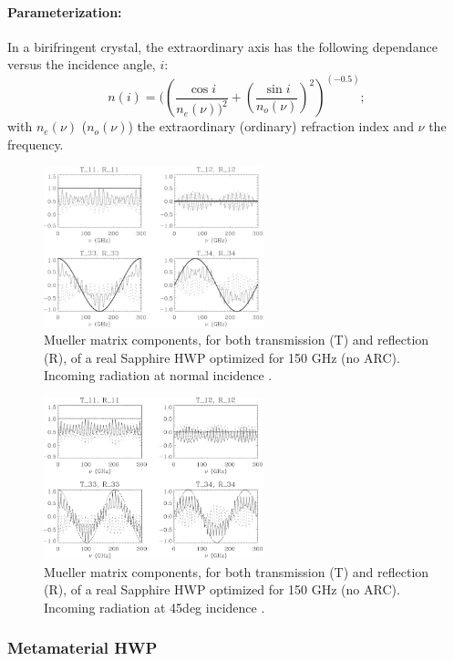 \paragraph{Parameterization:}
In a birifringent crystal, the extraordinary axis has the following dependance versus the incidence angle, $i$:
\begin{equation}
n(i)=((\frac{\cos{i}}{n_e(\nu))^2}+(\frac{\sin{i}}{n_o(\nu)})^2)^(-0.5);
\end{equation}
with $n_e(\nu)$ ($n_o(\nu)$) the extraordinary (ordinary) refraction index and $\nu$ the frequency.

\begin{figure}
\centering
\includegraphics[width=2.5in]{figures/0deg.png}
\caption{Mueller matrix components, for both transmission (T) and reflection (R), of a real Sapphire HWP
optimized for 150 GHz (no ARC). Incoming radiation at normal incidence \cite{Salatino17}.
}\label{0deg}
\end{figure}

\begin{figure}
\centering
\includegraphics[width=2.5in]{figures/45deg.png}
\caption{Mueller matrix components, for both transmission (T) and reflection (R), of a real Sapphire HWP
optimized for 150 GHz (no ARC). Incoming radiation at 45deg incidence \cite{Salatino17}.}\label{45deg}
\end{figure}

\subsubsection{Metamaterial HWP}


